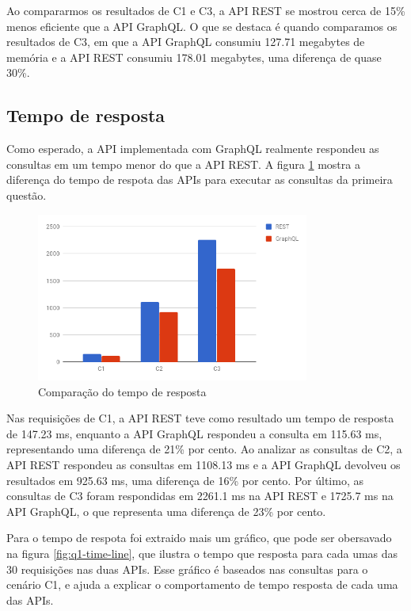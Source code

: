 Ao compararmos os resultados de C1 e C3, a API REST se mostrou cerca de 15\% menos eficiente que a API GraphQL. O que se destaca é quando comparamos os resultados de C3, em que a API GraphQL consumiu 127.71 megabytes de memória e a API REST consumiu 178.01 megabytes, uma diferença de quase 30\%.

\subsection{Tempo de resposta}

Como esperado, a API implementada com GraphQL realmente respondeu as consultas em um tempo menor do que a API REST. A figura \ref{fig:q1-time} mostra a diferença do tempo de respota das APIs para executar as consultas da primeira questão.

\begin{figure}[htbp]
    \centering
    \includegraphics[width=0.8\textwidth]{figuras/q1-time.png}
    \caption{Comparação do tempo de resposta}
    \label{fig:q1-time}
    \author{fonte: Autor}
\end{figure}

Nas requisições de C1, a API REST teve como resultado um tempo de resposta de 147.23 ms, enquanto a API GraphQL respondeu a consulta em 115.63 ms, representando uma diferença de 21\% por cento. Ao analizar as consultas de C2, a API REST respondeu as consultas em 1108.13 ms e a API GraphQL devolveu os resultados em 925.63 ms, uma diferença de 16\% por cento. Por último, as consultas de C3 foram respondidas em 2261.1 ms na API REST e 1725.7 ms na API GraphQL, o que representa uma diferença de 23\% por cento.

Para o tempo de respota foi extraido mais um gráfico, que pode ser obersavado na figura \ref{fig:q1-time-line}, que ilustra o tempo que resposta para cada umas das 30 requisições nas duas APIs. Esse gráfico é baseados nas consultas para o cenário C1, e ajuda a explicar o comportamento de tempo resposta de cada uma das APIs.

